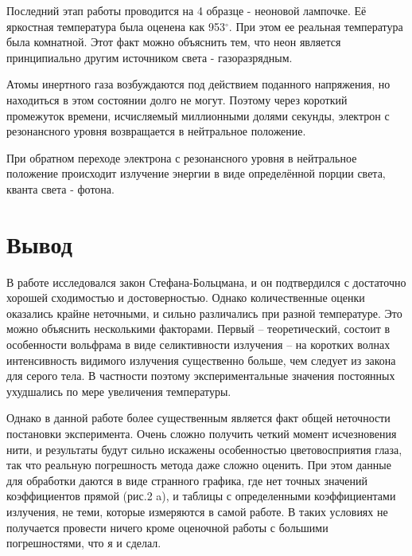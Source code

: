 \documentclass[a4paper, 14pt]{extarticle}%
\begin{document}
Последний этап работы проводится на 4 образце - неоновой лампочке. Её яркостная температура была оценена как 953$^{\circ}$. При этом ее реальная температура была комнатной. Этот факт можно объяснить тем, что неон является принципиально другим источником света - газоразрядным.

 Атомы инертного газа возбуждаются под действием поданного напряжения, но находиться в этом состоянии долго не могут. Поэтому через короткий промежуток времени, исчисляемый миллионными долями секунды, электрон с резонансного уровня возвращается в нейтральное положение.
 
При обратном переходе электрона с резонансного уровня в нейтральное положение происходит излучение энергии в виде определённой порции света, кванта света - фотона. 

\section*{Вывод}

В работе исследовался закон Стефана-Больцмана, и он подтвердился с достаточно хорошей сходимостью и достоверностью. Однако количественные оценки оказались крайне неточными, и сильно различались при разной температуре. Это можно объяснить несколькими факторами. Первый -- теоретический, состоит в особенности вольфрама в виде селиктивности излучения -- на коротких волнах интенсивность видимого излучения существенно больше, чем следует из закона для серого тела. В частности поэтому экспериментальные значения постоянных ухудшались по мере увеличения температуры.

Однако в данной работе более существенным является факт общей неточности постановки эксперимента. Очень сложно получить четкий момент исчезновения нити, и результаты будут сильно искажены особенностью цветовосприятия глаза, так что реальную погрешность метода даже сложно оценить. При этом данные для обработки даются в виде странного графика, где нет точных значений коэффициентов прямой (рис.2 a), и таблицы с определенными коэффициентами излучения, не теми, которые измеряются в самой работе. В таких условиях не получается провести ничего кроме оценочной работы с большими погрешностями, что я и сделал.
\end{document}
